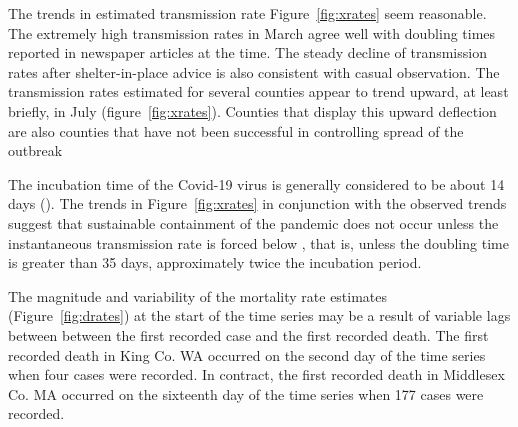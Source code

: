 \documentclass[12pt,letterpaper]{article}
\newcommand\help[1]{\color{Magenta}{\it #1 }\normalcolor}
\begin{document}
The trends in estimated transmission rate Figure~\ref{fig:xrates} seem
reasonable. The extremely high transmission rates in March agree well
with doubling times reported in newspaper articles at the time.
The steady decline of transmission rates after shelter-in-place advice is 
also consistent with casual observation.
The transmission rates estimated for several counties appear to trend
upward, at least briefly, in July (figure~\ref{fig:xrates}). Counties
that display this upward deflection are also counties that have not
been successful in controlling spread of the outbreak

The incubation time of the Covid-19 virus is generally considered to be
about 14 days (\cite{Someone2020}).
The trends in Figure~\ref{fig:xrates} in conjunction with the
observed trends suggest that sustainable containment of
the pandemic does not occur unless the instantaneous transmission rate
is forced below \help{ $0.018 da^{-1}$}, that is, unless the doubling
time is greater than 35 days, approximately twice the incubation
period.

The magnitude and variability of the mortality rate estimates
(Figure~\ref{fig:drates})
at the start of the time series may be a result of variable lags
between between the first recorded case and the first recorded death.
The first recorded death in King Co. WA occurred on the second day of
the time series when four cases were recorded.
In contract, the first recorded death in Middlesex Co. MA occurred on
the sixteenth day of the time series when 177 cases were recorded.



\clearpage
\printbibliography[title=References]
\clearpage
\end{document}
